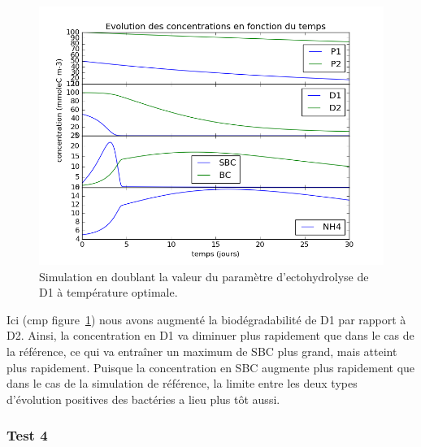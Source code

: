 \begin{figure}[h!]
  \includegraphics[width=\textwidth]{partie2/Test3.png}
  \caption{Simulation en doublant la valeur du param\`etre d'ectohydrolyse de D1 \`a temp\'erature optimale.
  }
  \label{fig:partie2test3}
\end{figure}

\par{
Ici (cmp figure~\ref{fig:partie2test3})
nous avons augment\'e la biod\'egradabilit\'e de D1 par rapport \`a D2. Ainsi, la concentration en D1 va diminuer plus rapidement que dans le cas de la r\'ef\'erence, ce qui va entra\^iner un maximum de SBC plus grand, mais atteint plus rapidement. Puisque la concentration en SBC augmente plus rapidement que dans le cas de la simulation de r\'ef\'erence, la limite entre les deux types d'\'evolution positives des bact\'eries a lieu plus t\^ot aussi.
}

\FloatBarrier
\newpage
\subsubsection{Test 4}

